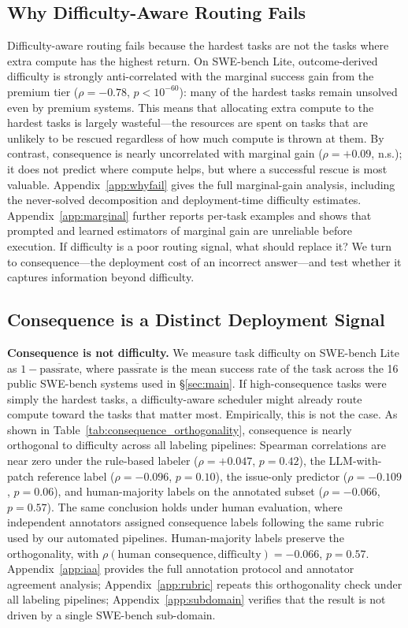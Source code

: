 \documentclass{article}
\begin{document}
\subsection{Why Difficulty-Aware Routing Fails}

Difficulty-aware routing fails because the hardest tasks are not the tasks where extra compute has the highest return. On SWE-bench Lite, outcome-derived difficulty is strongly anti-correlated with the marginal success gain from the premium tier ($\rho=-0.78$, $p<10^{-60}$): many of the hardest tasks remain unsolved even by premium systems. This means that allocating extra compute to the hardest tasks is largely wasteful---the resources are spent on tasks that are unlikely to be rescued regardless of how much compute is thrown at them. By contrast, consequence is nearly uncorrelated with marginal gain ($\rho=+0.09$, n.s.); it does not predict where compute helps, but where a successful rescue is most valuable. Appendix~\ref{app:whyfail} gives the full marginal-gain analysis, including the never-solved decomposition and deployment-time difficulty estimates. Appendix~\ref{app:marginal} further reports per-task examples and shows that prompted and learned estimators of marginal gain are unreliable before execution.
If difficulty is a poor routing signal, what should replace it? We turn to consequence---the deployment cost of an incorrect answer---and test whether it captures information beyond difficulty.

\subsection{Consequence is a Distinct Deployment Signal}

\textbf{Consequence is not difficulty.}
We measure task difficulty on SWE-bench Lite as $1-\overline{\mathrm{passrate}}$, where $\overline{\mathrm{passrate}}$ is the mean success rate of the task across the 16 public SWE-bench systems used in \S\ref{sec:main}. If high-consequence tasks were simply the hardest tasks, a difficulty-aware scheduler might already route compute toward the tasks that matter most. Empirically, this is not the case.
As shown in Table~\ref{tab:consequence_orthogonality}, consequence is nearly orthogonal to difficulty across all labeling pipelines: Spearman correlations are near zero under the rule-based labeler ($\rho=+0.047$, $p=0.42$), the LLM-with-patch reference label ($\rho=-0.096$, $p=0.10$), the issue-only predictor ($\rho=-0.109$, $p=0.06$), and human-majority labels on the annotated subset ($\rho=-0.066$, $p=0.57$). The same conclusion holds under human evaluation, where independent annotators assigned consequence labels following the same rubric used by our automated pipelines. Human-majority labels preserve the orthogonality, with $\rho(\text{human consequence}, \text{difficulty}) = -0.066$, $p = 0.57$. Appendix~\ref{app:iaa} provides the full annotation protocol and annotator agreement analysis; Appendix~\ref{app:rubric} repeats this orthogonality check under all labeling pipelines; Appendix~\ref{app:subdomain} verifies that the result is not driven by a single SWE-bench sub-domain.
\end{document}

